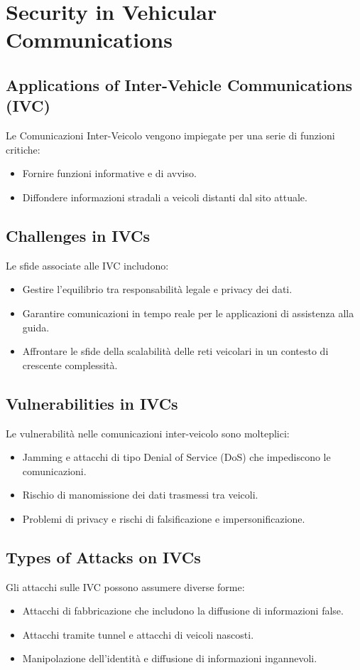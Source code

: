 \section{Security in Vehicular Communications}

\subsection{Applications of Inter-Vehicle Communications (IVC)}
Le Comunicazioni Inter-Veicolo vengono impiegate per una serie di funzioni critiche:
\begin{itemize}
  \item Fornire funzioni informative e di avviso.
  \item Diffondere informazioni stradali a veicoli distanti dal sito attuale. 
\end{itemize}

\subsection{Challenges in IVCs}
Le sfide associate alle IVC includono:
\begin{itemize}
  \item Gestire l'equilibrio tra responsabilità legale e privacy dei dati.
  \item Garantire comunicazioni in tempo reale per le applicazioni di assistenza alla guida. 
  \item Affrontare le sfide della scalabilità delle reti veicolari in un contesto di crescente
complessità.
\end{itemize}

\subsection{Vulnerabilities in IVCs}
Le vulnerabilità nelle comunicazioni inter-veicolo sono molteplici: 
\begin{itemize}
  \item Jamming e attacchi di tipo Denial of Service (DoS) che impediscono le
    comunicazioni. 
  \item Rischio di manomissione dei dati trasmessi tra veicoli. 
  \item Problemi di privacy e rischi di falsificazione e impersonificazione.
\end{itemize}

\subsection{Types of Attacks on IVCs}
Gli attacchi sulle IVC possono assumere diverse
forme: 
\begin{itemize}
  \item Attacchi di fabbricazione che includono la diffusione di informazioni false.
  \item Attacchi tramite tunnel e attacchi di veicoli nascosti.
  \item Manipolazione dell'identità e diffusione di informazioni ingannevoli.
\end{itemize}

